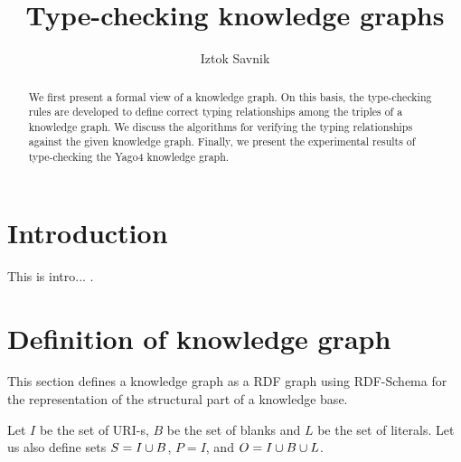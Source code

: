 \documentclass[runningheads]{llncs}
\begin{document}
\title{Type-checking knowledge graphs}

\author{Iztok Savnik} 



\maketitle

\begin{abstract}
  We first present a formal view of a knowledge graph. On this basis,
  the type-checking rules are developed to define correct typing
  relationships among the triples of a knowledge graph. We discuss the
  algorithms for verifying the typing relationships against the given
  knowledge graph. Finally, we present the experimental results of
  type-checking the Yago4 knowledge graph.

\end{abstract}


\thispagestyle{headings}
\tableofcontents
\newpage

\section{Introduction}

This is intro... \cite{Hogan22KGsSurveyCsur}.





\section{Definition of knowledge graph}

This section defines a knowledge graph as a RDF graph \cite{rdf} using
RDF-Schema \cite{rdfschema} for the representation of the structural
part of a knowledge base.

Let $I$ be the set of URI-s, $B$ be the set of blanks and $L$ be the
set of literals. Let us also define sets $S = I\cup\/B$, $P = I$, and
$O = I\cup\/B\cup\/L$.
\end{document}
